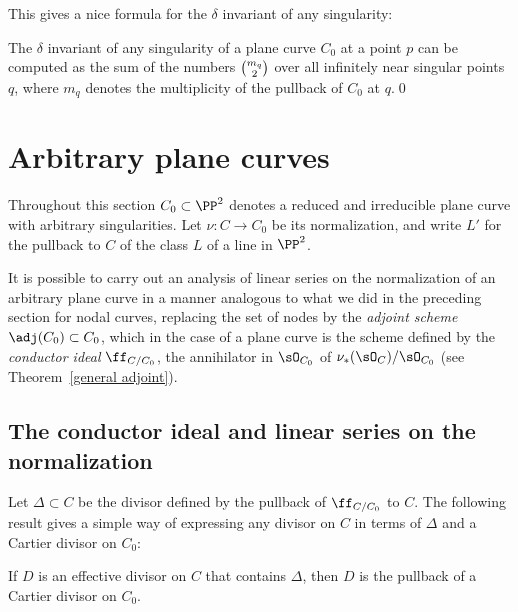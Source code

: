 This gives a nice formula for the $\delta$ invariant of any singularity:

\begin{corollary}
\label{computing delta}
The $\delta$ invariant of any singularity of a plane curve $C_{0}$ at
a point $p$ can be computed as the sum of the numbers $\tbinom{m_{q}}{2}$
over all infinitely near singular points $q$,
%
where
$m_{q}$
denotes the multiplicity of the pullback of $C_{0}$ at $q$.\qed
\end{corollary}

\section{Arbitrary plane curves} \label{arbitrary plane curves}

Throughout this section $C_0 \subset \PP^2$ denotes a reduced and
irreducible plane curve with arbitrary singularities. Let $\nu : C
\to C_0$ be its normalization, and write $L'$ for the pullback to $C$
of the class $L$ of a line in $\PP^{2}$.

It is possible to carry out an analysis of linear series on the
normalization of an arbitrary plane curve in a manner  analogous to
%
what we did in the preceding section for nodal curves, replacing 
the set of nodes by the 
\emph{adjoint scheme}
%
$\adj(C_{0})\subset C_{0}$, which in the case of a plane curve is the scheme
%
%
defined by the \emph{conductor ideal} $\ff_{C/C_0}$, the annihilator
in $\sO_{C_{0}}$ of $\nu_{*}(\sO_{C})/\sO_{C_{0}}$
(see Theorem~\ref{general adjoint}). 

\subsection*{The conductor ideal and linear series on the normalization}

Let 
$\Delta\subset C$ be the
divisor
defined by the pullback of $\ff_{C/C_0}$ to $C$.
The following result gives a simple way of expressing any divisor on $C$
%
in terms of $\Delta$ and a
Cartier divisor on $C_{0}$:

\begin{theorem}\label{Cartier on C}
If $D$ is an effective divisor on $C$ that contains $\Delta$,
then $D$ is the pullback of a Cartier divisor on $C_{0}$.
\unif
\end{theorem}

